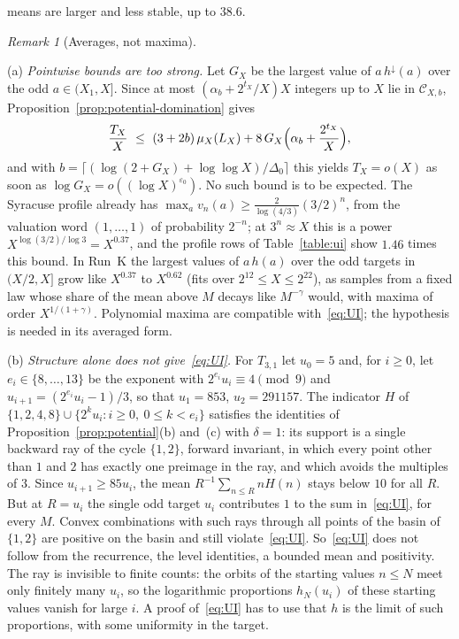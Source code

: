 \documentclass[12pt]{amsart}
\theoremstyle{definition}
\theoremstyle{remark}
\newtheorem{remark}{Remark}
\begin{document}
means are larger and less stable, up to $38.6$.

\begin{remark}[Averages, not maxima]
\label{rem:spikes}
\leavevmode\par
(a) \emph{Pointwise bounds are too strong.} Let $G_X$ be the largest value of $a\,h^\downarrow(a)$ over the odd $a\in(X_1,X]$. Since at most $(\alpha_b+2^{t_X}/X)X$ integers up to $X$ lie in $\mathcal C_{X,b}$, Proposition~\ref{prop:potential-domination} gives
\[
 \frac{T_X}X\ \le\ (3+2b)\,\mu_X(L_X)+8\,G_X\Bigl(\alpha_b+\frac{2^{t_X}}X\Bigr),
\]
and with $b=\lceil(\log(2+G_X)+\log\log X)/\Delta_0\rceil$ this yields $T_X=o(X)$ as soon as $\log G_X=o((\log X)^{\varepsilon_0})$. No such bound is to be expected. The Syracuse profile already has $\max_a v_n(a)\ge\frac{2}{\log(4/3)}(3/2)^n$, from the valuation word $(1,\dots,1)$ of probability $2^{-n}$; at $3^n\approx X$ this is a power $X^{\log(3/2)/\log3}=X^{0.37}$, and the profile rows of Table~\ref{table:ui} show $1.46$ times this bound. In Run~K the largest values of $a\,h(a)$ over the odd targets in $(X/2,X]$ grow like $X^{0.37}$ to $X^{0.62}$ (fits over $2^{12}\le X\le2^{22}$), as samples from a fixed law whose share of the mean above $M$ decays like $M^{-\gamma}$ would, with maxima of order $X^{1/(1+\gamma)}$. Polynomial maxima are compatible with~\eqref{eq:UI}; the hypothesis is needed in its averaged form.

(b) \emph{Structure alone does not give~\eqref{eq:UI}.} For $T_{3,1}$ let $u_0=5$ and, for $i\ge0$, let $e_i\in\{8,\dots,13\}$ be the exponent with $2^{e_i}u_i\equiv4\pmod9$ and $u_{i+1}=(2^{e_i}u_i-1)/3$, so that $u_1=853$, $u_2=291157$. The indicator $H$ of $\{1,2,4,8\}\cup\{2^ku_i:i\ge0,\ 0\le k<e_i\}$ satisfies the identities of Proposition~\ref{prop:potential}(b) and~(c) with $\delta=1$: its support is a single backward ray of the cycle $\{1,2\}$, forward invariant, in which every point other than $1$ and $2$ has exactly one preimage in the ray, and which avoids the multiples of $3$. Since $u_{i+1}\ge85u_i$, the mean $R^{-1}\sum_{n\le R}nH(n)$ stays below $10$ for all $R$. But at $R=u_i$ the single odd target $u_i$ contributes $1$ to the sum in~\eqref{eq:UI}, for every $M$. Convex combinations with such rays through all points of the basin of $\{1,2\}$ are positive on the basin and still violate~\eqref{eq:UI}. So~\eqref{eq:UI} does not follow from the recurrence, the level identities, a bounded mean and positivity. The ray is invisible to finite counts: the orbits of the starting values $n\le N$ meet only finitely many $u_i$, so the logarithmic proportions $h_N(u_i)$ of these starting values vanish for large $i$. A proof of~\eqref{eq:UI} has to use that $h$ is the limit of such proportions, with some uniformity in the target.


\end{remark}
\end{document}
